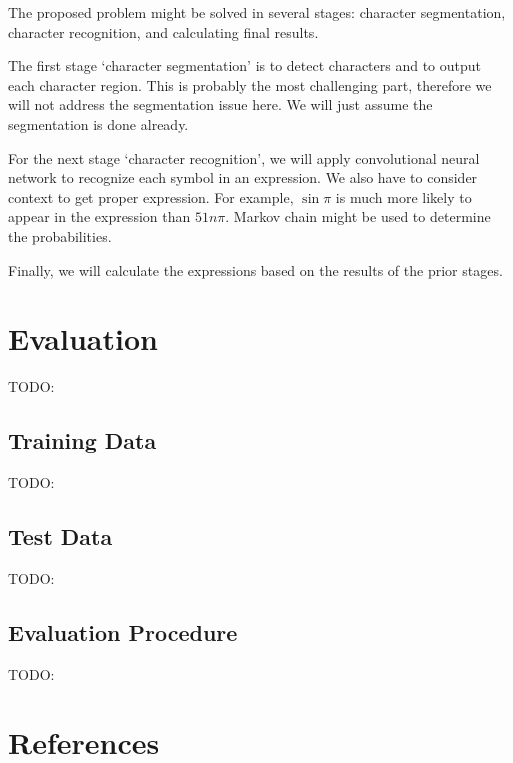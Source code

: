 \documentclass[10pt,twocolumn,letterpaper]{article}
\begin{document}
The proposed problem might be solved in several stages:
character segmentation, character recognition, and calculating final results.

The first stage `character segmentation' is to detect characters and to output each character region.
This is probably the most challenging part, therefore we will not address the segmentation issue here.
We will just assume the segmentation is done already. 

For the next stage `character recognition',
we will apply convolutional neural network to recognize each symbol in an expression.
We also have to consider context to get proper expression. For example, $\sin \pi$ is much more likely to appear in the expression than $51n \pi$. Markov chain might be used to determine the probabilities.

Finally, we will calculate the expressions based on the results of the prior stages.

\section{Evaluation}

TODO:

\subsection{Training Data}

TODO:

\subsection{Test Data}

TODO:

\subsection{Evaluation Procedure}
TODO:

\section{References}

{\small


}
\end{document}

